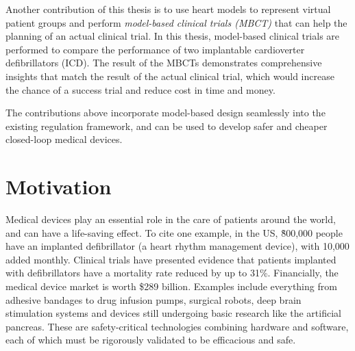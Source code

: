 \documentclass[a4paper]{article}
\begin{document}
Another contribution of this thesis is to use heart models to represent virtual patient groups and perform \emph{model-based clinical trials (MBCT)} that can help the planning of an actual clinical trial. 
In this thesis, model-based clinical trials are performed to compare the performance of two implantable cardioverter defibrillators (ICD). 
The result of the MBCTs demonstrates comprehensive insights that match the result of the actual clinical trial, which would increase the chance of a success trial and reduce cost in time and money.

The contributions above incorporate model-based design seamlessly into the existing regulation framework, and can be used to develop safer and cheaper closed-loop medical devices. 
\newpage
\section{Motivation}
Medical devices play an essential role in the care of patients around the world, and can have a life-saving effect.
To cite one example, 
in the US, \~ 800,000 people have an implanted defibrillator (a heart rhythm management device), with 10,000 added monthly.
Clinical trials have presented evidence that patients implanted with defibrillators have a mortality rate reduced by up to 31\%.
Financially, the medical device market is worth \$289 billion.
Examples include everything from adhesive bandages to drug infusion pumps, surgical robots, deep brain stimulation systems and devices still undergoing basic research like the artificial pancreas.
These are safety-critical technologies combining hardware and software, each of which must be rigorously validated to be efficacious and safe.
\end{document}
